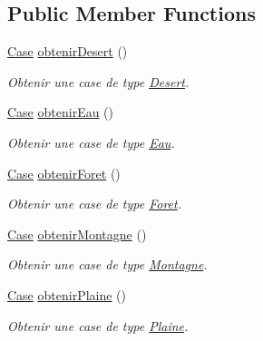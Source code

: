 \subsection*{Public Member Functions}
\begin{DoxyCompactItemize}
\item 
\hyperlink{class_small_world_1_1_case}{Case} \hyperlink{class_small_world_1_1_fabrique_case_add84ef5fe1dda0653f391ce3d174f1cf}{obtenir\-Desert} ()
\begin{DoxyCompactList}\small\item\em Obtenir une case de type \hyperlink{class_small_world_1_1_desert}{Desert}. \end{DoxyCompactList}\item 
\hyperlink{class_small_world_1_1_case}{Case} \hyperlink{class_small_world_1_1_fabrique_case_a1da8866890280c611893961e85ffddbb}{obtenir\-Eau} ()
\begin{DoxyCompactList}\small\item\em Obtenir une case de type \hyperlink{class_small_world_1_1_eau}{Eau}. \end{DoxyCompactList}\item 
\hyperlink{class_small_world_1_1_case}{Case} \hyperlink{class_small_world_1_1_fabrique_case_a391674c9165245c355aaa043028d5027}{obtenir\-Foret} ()
\begin{DoxyCompactList}\small\item\em Obtenir une case de type \hyperlink{class_small_world_1_1_foret}{Foret}. \end{DoxyCompactList}\item 
\hyperlink{class_small_world_1_1_case}{Case} \hyperlink{class_small_world_1_1_fabrique_case_a4d50e880c85785212a7317a1d3fa4da6}{obtenir\-Montagne} ()
\begin{DoxyCompactList}\small\item\em Obtenir une case de type \hyperlink{class_small_world_1_1_montagne}{Montagne}. \end{DoxyCompactList}\item 
\hyperlink{class_small_world_1_1_case}{Case} \hyperlink{class_small_world_1_1_fabrique_case_ac80166926c7b4ed6761fcbb57688736e}{obtenir\-Plaine} ()
\begin{DoxyCompactList}\small\item\em Obtenir une case de type \hyperlink{class_small_world_1_1_plaine}{Plaine}. \end{DoxyCompactList}\end{DoxyCompactItemize}
